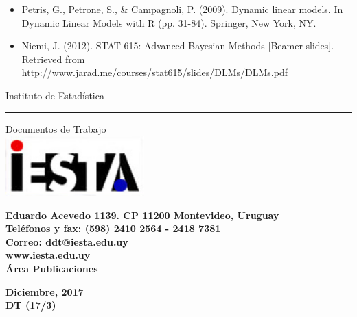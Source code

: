 \documentclass[12pt]{article}\usepackage[]{graphicx}\usepackage[]{color}
\begin{document}
% 
% 

\begin{itemize}
\item Petris, G., Petrone, S., \& Campagnoli, P. (2009). Dynamic linear models. In Dynamic Linear Models with R (pp. 31-84). Springer, New York, NY.

\item Niemi, J. (2012). STAT 615: Advanced Bayesian Methods [Beamer slides]. Retrieved from http://www.jarad.me/courses/stat615/slides/DLMs/DLMs.pdf

\end{itemize}

\pagebreak
\thispagestyle{empty}
\begin{center}

\vspace{1.5 cm}
{\Huge Instituto de Estadística} 
\noindent\rule{18cm}{0.4pt}

\vspace{0.5 cm}
\pagestyle{fancy}
{\Huge Documentos de Trabajo}\\
\thispagestyle{empty}
\vspace{1.5 cm}
\includegraphics[width=0.40\textwidth]{logo_iesta.png}

\thispagestyle{empty}
\vspace{4.5 cm}

\begin{flushright}
	\textbf{\large Eduardo Acevedo 1139. CP 11200
		Montevideo, Uruguay\\
		Teléfonos y fax: (598) 2410 2564 - 2418 7381\\
		Correo: ddt@iesta.edu.uy\\
		www.iesta.edu.uy\\
		Área Publicaciones\\}	
\end{flushright}

\vspace{1.5 cm}

\large\textbf{Diciembre, 2017}\\
\large\textbf{DT (17/3)}
\end{center}
\end{document}
